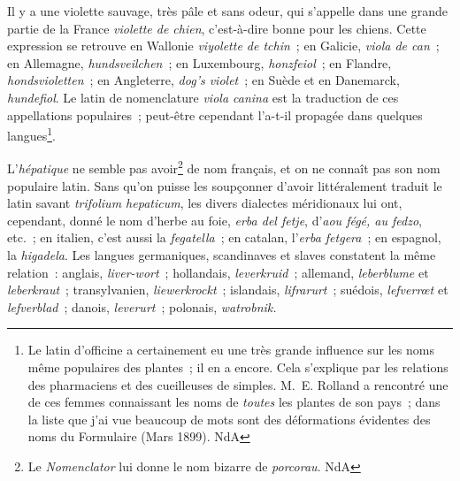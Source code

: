 \documentclass[french,twoside]{book} %
\def\mednobreak{\ifdim\lastskip<\medskipamount
  \removelastskip\nopagebreak\medskip\fi}
\newcommand{\labelblock}[1]{\medbreak{\noindent\color{rubric}\bfseries #1}\par\mednobreak}
\begin{document}
\labelblock{{\itshape Violette de chien. Hépatique. Anémone.}}

\noindent Il y a une violette sauvage, très pâle et sans odeur, qui s’appelle dans une grande partie de la France {\itshape violette de chien}, c’est-à-dire bonne pour les chiens. Cette expression se retrouve en Wallonie {\itshape viyolette de tchin} ; en Galicie, {\itshape viola de can} ; en Allemagne, {\itshape hundsveilchen} ; en Luxembourg, {\itshape honzfeiol} ; en Flandre, {\itshape hondsvioletten} ; en Angleterre, {\itshape dog’s violet} ; en Suède et en Danemarck, {\itshape hundefiol}. Le latin de nomenclature {\itshape viola canina} est la traduction de ces appellations populaires ; peut-être cependant l’a-t-il propagée dans quelques langues\footnote{ Le latin d’officine a certainement eu une très grande influence sur les noms même populaires des plantes ; il en a encore. Cela s’explique par les relations des pharmaciens et des cueilleuses de simples. M. E. Rolland a rencontré une de ces femmes connaissant les noms de {\itshape toutes} les plantes de son pays ; dans la liste que j’ai vue beaucoup de mots sont des déformations évidentes des noms du Formulaire (Mars 1899). NdA}.\par
L’{\itshape hépatique} ne semble pas avoir\footnote{ Le {\itshape Nomenclator} lui donne le nom bizarre de {\itshape porcorau}. NdA} de nom français, et on ne connaît pas son nom populaire latin. Sans qu’on puisse les soupçonner d’avoir littéralement traduit le latin savant {\itshape trifolium hepaticum}, les divers dialectes méridionaux lui ont, cependant, donné le nom d’herbe au foie, {\itshape erba del fetje}, d’{\itshape aou fégé, au fedzo}, etc. ; en italien, c’est aussi la {\itshape fegatella} ; en catalan, l’{\itshape erba fetgera} ; en espagnol, la {\itshape higadela}. Les langues germaniques, scandinaves et slaves constatent la même relation : anglais, {\itshape liver-wort} ; hollandais, {\itshape leverkruid} ; allemand, {\itshape leberblume} et {\itshape leberkraut} ; transylvanien, {\itshape liewerkrockt} ; islandais, {\itshape lifrarurt} ; suédois, {\itshape lefverrœt} et {\itshape lefverblad} ; danois, {\itshape leverurt} ; polonais, {\itshape watrobnik.}\par
\end{document}

